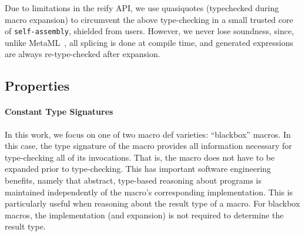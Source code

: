 \documentclass[preprint,nocopyrightspace]{sigplanconf}
\newcommand{\sselfassembly}{\texttt{self-assembly}}
\begin{document}
Due to limitations in the reify API, we use quasiquotes (typechecked during
macro expansion) to circumvent the above type-checking in a small trusted core
of \sselfassembly, shielded from users. However, we never lose soundness,
since, unlike MetaML~\cite{MetaML}, all splicing is done at compile time, and
generated expressions are always re-type-checked after expansion.





\subsection{Properties}

\paragraph{Constant Type Signatures} In this work, we focus on one of two macro def
varieties: ``blackbox'' macros. In this case, the type signature of
the macro provides all information necessary for type-checking all of its
invocations. That is, the macro does not have to be expanded prior to type-checking.
This has important software engineering benefits, namely that
abstract, type-based reasoning about programs is maintained independently of
the macro's corresponding implementation. This is particularly useful when
reasoning about the result type of a macro. For blackbox macros, the
implementation (and expansion) is not required to determine the result
type.
\end{document}
